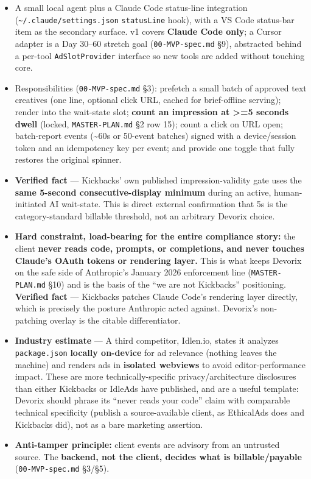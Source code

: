 \begin{itemize}
  \item A small local agent plus a Claude Code status-line integration (\texttt{\textasciitilde{}/.claude/settings.json} \texttt{statusLine} hook), with a VS Code status-bar item as the secondary surface. v1 covers \textbf{Claude Code only}; a Cursor adapter is a Day 30--60 stretch goal (\texttt{00-MVP-spec.md} \S9), abstracted behind a per-tool \texttt{AdSlotProvider} interface so new tools are added without touching core.
  \item Responsibilities (\texttt{00-MVP-spec.md} \S3): prefetch a small batch of approved text creatives (one line, optional click URL, cached for brief-offline serving); render into the wait-state slot; \textbf{count an impression at \textgreater{}=5 seconds dwell} (locked, \texttt{MASTER-PLAN.md} \S2 row 15); count a click on URL open; batch-report events (\textasciitilde{}60s or 50-event batches) signed with a device/session token and an idempotency key per event; and provide one toggle that fully restores the original spinner.
  \item \textbf{Verified fact} \citep{kickbacks_faq_2026} --- Kickbacks' own published impression-validity gate uses the \textbf{same 5-second consecutive-display minimum} during an active, human-initiated AI wait-state. This is direct external confirmation that 5s is the category-standard billable threshold, not an arbitrary Devorix choice.
  \item \textbf{Hard constraint, load-bearing for the entire compliance story:} the client \textbf{never reads code, prompts, or completions, and never touches Claude's OAuth tokens or rendering layer.} This is what keeps Devorix on the safe side of Anthropic's January 2026 enforcement line (\texttt{MASTER-PLAN.md} \S10) and is the basis of the ``we are not Kickbacks'' positioning. \textbf{Verified fact} \citep{kickbacksgithub_2026} --- Kickbacks patches Claude Code's rendering layer directly, which is precisely the posture Anthropic acted against. Devorix's non-patching overlay is the citable differentiator.
  \item \textbf{Industry estimate} \citep{idlen_2026} --- A third competitor, Idlen.io, states it analyzes \texttt{package.json} \textbf{locally on-device} for ad relevance (nothing leaves the machine) and renders ads in \textbf{isolated webviews} to avoid editor-performance impact. These are more technically-specific privacy/architecture disclosures than either Kickbacks or IdleAds have published, and are a useful template: Devorix should phrase its ``never reads your code'' claim with comparable technical specificity (publish a source-available client, as EthicalAds does and Kickbacks did), not as a bare marketing assertion.
  \item \textbf{Anti-tamper principle:} client events are advisory from an untrusted source. The \textbf{backend, not the client, decides what is billable/payable} (\texttt{00-MVP-spec.md} \S3/\S5).
\end{itemize}

